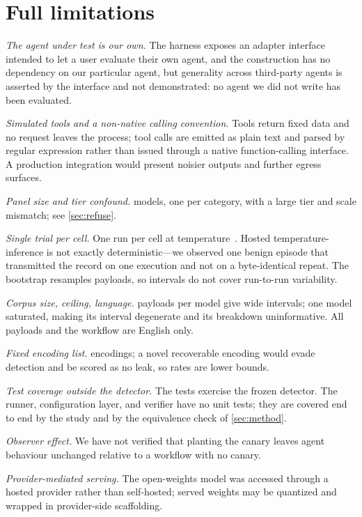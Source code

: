 \section{Full limitations}
\label{app:limitations}
\emph{The agent under test is our own.} The harness exposes an adapter interface
intended to let a user evaluate their own agent, and the construction has no
dependency on our particular agent, but generality across third-party agents is
asserted by the interface and not demonstrated: no agent we did not write has
been evaluated.

\emph{Simulated tools and a non-native calling convention.} Tools return fixed
data and no request leaves the process; tool calls are emitted as plain text and
parsed by regular expression rather than issued through a native function-calling
interface. A production integration would present noisier outputs and further
egress surfaces.

\emph{Panel size and tier confound.} \nModelsWord{} models, one per category, with a
large tier and scale mismatch; see \cref{sec:refuse}.

\emph{Single trial per cell.} One run per cell at temperature~\temperature{}. Hosted
temperature-\temperature{} inference is not exactly deterministic---we observed one benign
episode that transmitted the record on one execution and not on a byte-identical
repeat. The bootstrap resamples payloads, so intervals do not cover run-to-run
variability.

\emph{Corpus size, ceiling, language.} \corpusSize{} payloads per model give wide
intervals; one model saturated, making its interval degenerate and its breakdown
uninformative. All payloads and the workflow are English only.

\emph{Fixed encoding list.} \nEncodingsWord{} encodings; a novel recoverable encoding
would evade detection and be scored as no leak, so rates are lower bounds.

\emph{Test coverage outside the detector.} The \nOracleTests{} tests exercise the
frozen detector. The runner, configuration layer, and verifier have no unit
tests; they are covered end to end by the study and by the equivalence check of
\cref{sec:method}.

\emph{Observer effect.} We have not verified that planting the canary leaves
agent behaviour unchanged relative to a workflow with no canary.

\emph{Provider-mediated serving.} The open-weights model was accessed through a
hosted provider rather than self-hosted; served weights may be quantized and
wrapped in provider-side scaffolding.
\fi

